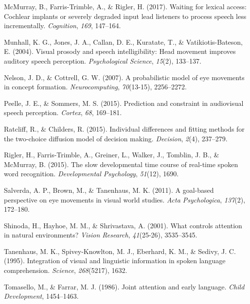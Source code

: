 \documentclass[,man,floatsintext]{apa6}
\begin{document}
\hypertarget{ref-mcmurray2017waiting}{}
McMurray, B., Farris-Trimble, A., \& Rigler, H. (2017). Waiting for
lexical access: Cochlear implants or severely degraded input lead
listeners to process speech less incrementally. \emph{Cognition},
\emph{169}, 147--164.

\hypertarget{ref-munhall2004visual}{}
Munhall, K. G., Jones, J. A., Callan, D. E., Kuratate, T., \&
Vatikiotis-Bateson, E. (2004). Visual prosody and speech
intelligibility: Head movement improves auditory speech perception.
\emph{Psychological Science}, \emph{15}(2), 133--137.

\hypertarget{ref-nelson2007probabilistic}{}
Nelson, J. D., \& Cottrell, G. W. (2007). A probabilistic model of eye
movements in concept formation. \emph{Neurocomputing}, \emph{70}(13-15),
2256--2272.

\hypertarget{ref-peelle2015prediction}{}
Peelle, J. E., \& Sommers, M. S. (2015). Prediction and constraint in
audiovisual speech perception. \emph{Cortex}, \emph{68}, 169--181.

\hypertarget{ref-ratcliff2015individual}{}
Ratcliff, R., \& Childers, R. (2015). Individual differences and fitting
methods for the two-choice diffusion model of decision making.
\emph{Decision}, \emph{2}(4), 237--279.

\hypertarget{ref-rigler2015slow}{}
Rigler, H., Farris-Trimble, A., Greiner, L., Walker, J., Tomblin, J. B.,
\& McMurray, B. (2015). The slow developmental time course of real-time
spoken word recognition. \emph{Developmental Psychology}, \emph{51}(12),
1690.

\hypertarget{ref-salverda2011goal}{}
Salverda, A. P., Brown, M., \& Tanenhaus, M. K. (2011). A goal-based
perspective on eye movements in visual world studies. \emph{Acta
Psychologica}, \emph{137}(2), 172--180.

\hypertarget{ref-shinoda2001controls}{}
Shinoda, H., Hayhoe, M. M., \& Shrivastava, A. (2001). What controls
attention in natural environments? \emph{Vision Research},
\emph{41}(25-26), 3535--3545.

\hypertarget{ref-tanenhaus1995integration}{}
Tanenhaus, M. K., Spivey-Knowlton, M. J., Eberhard, K. M., \& Sedivy, J.
C. (1995). Integration of visual and linguistic information in spoken
language comprehension. \emph{Science}, \emph{268}(5217), 1632.

\hypertarget{ref-tomasello1986joint}{}
Tomasello, M., \& Farrar, M. J. (1986). Joint attention and early
language. \emph{Child Development}, 1454--1463.
\end{document}
